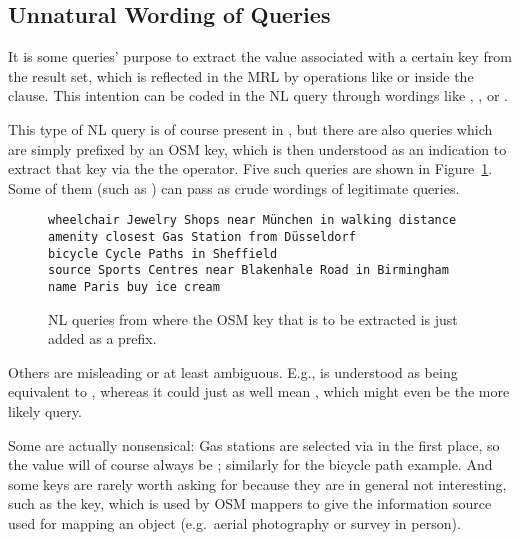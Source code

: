 \subsection{Unnatural Wording of Queries}
\label{sec:unnatural-wording}

It is some queries’ purpose to extract the value associated with a certain key
from the result set, which is reflected in the MRL by operations like
 or  inside the 
clause. This intention can be coded in the NL query through wordings like
, ,  or .

This type of NL query is of course present in \nlmapstwo{}, but there are also
queries which are simply prefixed by an OSM key, which is then understood as an
indication to extract that key via the the  operator. Five such
queries are shown in Figure~\ref{fig:nlmaps-v2-unnatural-wording}. Some of them
(such as ) can pass as crude wordings of legitimate
queries.

\begin{figure}[h]
  \centering
  \begin{lstlisting}[style=MyNL]
wheelchair Jewelry Shops near München in walking distance
amenity closest Gas Station from Düsseldorf
bicycle Cycle Paths in Sheffield
source Sports Centres near Blakenhale Road in Birmingham
name Paris buy ice cream
  \end{lstlisting}
  \caption[Unnatural \nlmapstwo{} queries]{NL queries from \nlmapstwo{} where
    the OSM key that is to be extracted is just added as a prefix.}
  \label{fig:nlmaps-v2-unnatural-wording}
\end{figure}

Others are misleading or at least ambiguous. E.g.,  is understood as being equivalent to
,
whereas it could just as well mean , which might even be the more likely query.

Some are actually nonsensical: Gas stations are selected via
 in the first place, so the  value will of
course always be ; similarly for the bicycle path example. And some
keys are rarely worth asking for because they are in general not interesting,
such as the  key, which is used by OSM mappers to give the
information source used for mapping an object (e.g.\ aerial photography or survey
in person).

